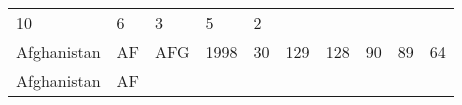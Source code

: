 \documentclass[]{article}
\begin{document}
\begin{longtable}[]{@{}llllllllll@{}}
\begin{minipage}[t]{0.09\columnwidth}
10\strut
\end{minipage} & \begin{minipage}[t]{0.09\columnwidth}\raggedright
6\strut
\end{minipage} & \begin{minipage}[t]{0.09\columnwidth}\raggedright
3\strut
\end{minipage} & \begin{minipage}[t]{0.09\columnwidth}\raggedright
5\strut
\end{minipage} & \begin{minipage}[t]{0.09\columnwidth}\raggedright
2\strut
\end{minipage}\tabularnewline
\begin{minipage}[t]{0.08\columnwidth}\raggedright
Afghanistan\strut
\end{minipage} & \begin{minipage}[t]{0.04\columnwidth}\raggedright
AF\strut
\end{minipage} & \begin{minipage}[t]{0.04\columnwidth}\raggedright
AFG\strut
\end{minipage} & \begin{minipage}[t]{0.04\columnwidth}\raggedright
1998\strut
\end{minipage} & \begin{minipage}[t]{0.08\columnwidth}\raggedright
30\strut
\end{minipage} & \begin{minipage}[t]{0.09\columnwidth}\raggedright
129\strut
\end{minipage} & \begin{minipage}[t]{0.09\columnwidth}\raggedright
128\strut
\end{minipage} & \begin{minipage}[t]{0.09\columnwidth}\raggedright
90\strut
\end{minipage} & \begin{minipage}[t]{0.09\columnwidth}\raggedright
89\strut
\end{minipage} & \begin{minipage}[t]{0.09\columnwidth}\raggedright
64\strut
\end{minipage}\tabularnewline
\begin{minipage}[t]{0.08\columnwidth}\raggedright
Afghanistan\strut
\end{minipage} & \begin{minipage}[t]{0.04\columnwidth}\raggedright
AF\strut
\end{minipage} & \begin{minipage}[t]{0.04\columnwidth}\raggedright

\end{minipage}
\end{longtable}
\end{document}
